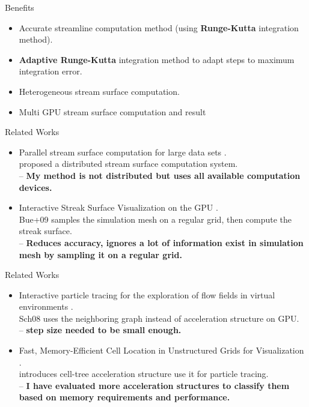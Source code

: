 \documentclass{beamer}
\begin{document}
\begin{frame}{Benefits}
	
	\begin{itemize}
		\item Accurate streamline computation method (using \textbf{Runge-Kutta} integration method).
		\item \textbf{Adaptive Runge-Kutta} integration method to adapt steps to maximum integration error.
		\item Heterogeneous stream surface computation.
		\item Multi GPU stream surface computation and result 
	\end{itemize}
	\textbf{}
	
\end{frame}

\begin{frame}{Related Works}
	\begin{itemize}
		\item Parallel stream surface computation for large data sets \cite{CampPaper}.\\
		proposed a distributed stream surface computation system.\\
		-- \textbf{My method is not distributed but uses all available computation devices.}
		\item Interactive Streak Surface Visualization on the GPU \cite{BurgerStreakSurface}.\\
		Bue+09 samples the simulation mesh on a regular grid, then compute the streak surface.\\
		-- \textbf{Reduces accuracy, ignores a lot of information exist in simulation mesh by sampling it on a regular grid.}
	\end{itemize}
\end{frame}

\begin{frame}{Related Works}
	\begin{itemize}
		\item Interactive particle tracing for the exploration of flow fields in virtual environments \cite{Schirski:50085}.\\
		Sch08 uses the neighboring graph instead of acceleration
		structure on GPU.\\
		-- \textbf{step size needed to be small enough.}
		\item Fast, Memory-Efficient Cell Location in Unstructured Grids for
		Visualization \cite{GarthPaper}.\\
		introduces cell-tree acceleration structure use it for
		particle tracing.\\
		-- \textbf{I have evaluated more acceleration structures to classify them based on memory requirements and performance.}
	\end{itemize}
\end{frame}
\end{document}
